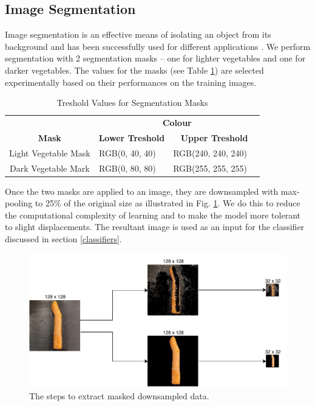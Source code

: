 \subsection{Image Segmentation}
Image segmentation is an effective means of isolating an object from its background and has been successfully used for different applications \cite{b4_1,b4_2,b4_3}. We perform segmentation with 2 segmentation masks -- one for lighter vegetables and one for darker vegetables. The values for the masks (see Table \ref{tab:mask_vals}) are selected experimentally based on their performances on the training images.

\bgroup
\def\arraystretch{1.5}
\begin{table}[htbp]
	\caption{Treshold Values for Segmentation Masks}
	\begin{center}
		\begin{tabular}{|c|c|c|c|c|}
			\hline
			& \multicolumn{4}{c|}{\textbf{Colour}}                                                         \\ \cline{2-5} 
			\multirow{-2}{*}{\textbf{Mask}} & \multicolumn{2}{c|}{\textbf{Lower Treshold}} & \multicolumn{2}{c|}{\textbf{Upper Treshold}}  \\ \hline
			Light Vegetable Mask            & RGB(0, 40, 40)   & \cellcolor[HTML]{002828}  & RGB(240, 240, 240) & \cellcolor[HTML]{F0F0F0} \\ \hline
			Dark Vegetable Mark             & RGB(0, 80, 80)   & \cellcolor[HTML]{005050}  & RGB(255, 255, 255) & \cellcolor[HTML]{FFFFFF} \\ \hline
		\end{tabular}
		\label{tab:mask_vals}
	\end{center}
\end{table}
\egroup

Once the two masks are applied to an image, they are downsampled with max-pooling to 25\% of the original size as illustrated in Fig. \ref{fig:mask}. We do this to reduce the computational complexity of learning and to make the model more tolerant to slight displacements. The resultant image is used as an input for the classifier discussed in section \ref{classifiers}.

\begin{figure}[tp]
	\centerline{\includegraphics[scale=0.5]{./img/mask.pdf}}
	\caption{The steps to extract masked downsampled data.}
	\label{fig:mask}
\end{figure}

